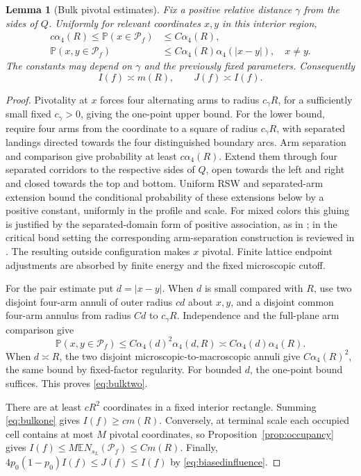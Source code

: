 \documentclass[11pt]{amsart}
\newtheorem{lemma}[theorem]{Lemma}
\theoremstyle{remark}
\newcommand{\Prob}{\mathbb P}
\newcommand{\E}{\mathbb E}
\newcommand{\cP}{\mathcal P}
\begin{document}
\begin{lemma}[Bulk pivotal estimates]\label{lem:bulkmoments}
Fix a positive relative distance $\gamma$ from the sides of $Q$. Uniformly for relevant coordinates $x,y$ in this interior region,
\begin{align}
 c\alpha_4(R)\le\Prob(x\in\cP_f)&\le C\alpha_4(R),\label{eq:bulkone}\\
 \Prob(x,y\in\cP_f)&\le C\alpha_4(R)\alpha_4(|x-y|),\quad x\ne y.\label{eq:bulktwo}
\end{align}
The constants may depend on $\gamma$ and the previously fixed parameters. Consequently
\begin{equation}\label{eq:meancomparison}
 I(f)\asymp m(R),\qquad J(f)\asymp I(f).
\end{equation}
\end{lemma}
\begin{proof}
Pivotality at $x$ forces four alternating arms to radius $c_\gamma R$, for a sufficiently small fixed $c_\gamma>0$, giving the one-point upper bound. For the lower bound, require four arms from the coordinate to a square of radius $c_\gamma R$, with separated landings directed towards the four distinguished boundary arcs. Arm separation and comparison give probability at least $c\alpha_4(R)$. Extend them through four separated corridors to the respective sides of $Q$, open towards the left and right and closed towards the top and bottom. Uniform RSW and separated-arm extension bound the conditional probability of these extensions below by a positive constant, uniformly in the profile and scale. For mixed colors this gluing is justified by the separated-domain form of positive association, as in \cite[Lemma~13 and Theorem~11]{Nolin}; in the critical bond setting the corresponding arm-separation construction is reviewed in \cite[Section~2.2]{GPS}. The resulting outside configuration makes $x$ pivotal. Finite lattice endpoint adjustments are absorbed by finite energy and the fixed microscopic cutoff.

For the pair estimate put $d=|x-y|$. When $d$ is small compared with $R$, use two disjoint four-arm annuli of outer radius $cd$ about $x,y$, and a disjoint common four-arm annulus from radius $Cd$ to $c_\gamma R$. Independence and the full-plane arm comparison give
\[
 \Prob(x,y\in\cP_f)\le C\alpha_4(d)^2\alpha_4(d,R)
 \asymp C\alpha_4(d)\alpha_4(R).
\]
When $d\asymp R$, the two disjoint microscopic-to-macroscopic annuli give $C\alpha_4(R)^2$, the same bound by fixed-factor regularity. For bounded $d$, the one-point bound suffices. This proves \eqref{eq:bulktwo}.

There are at least $cR^2$ coordinates in a fixed interior rectangle. Summing \eqref{eq:bulkone} gives $I(f)\ge cm(R)$. Conversely, at terminal scale each occupied cell contains at most $M$ pivotal coordinates, so Proposition~\ref{prop:occupancy} gives $I(f)\le M\E N_{s_L}(\cP_f)\le Cm(R)$. Finally, $4p_0(1-p_0)I(f)\le J(f)\le I(f)$ by \eqref{eq:biasedinfluence}.
\end{proof}
\end{document}
